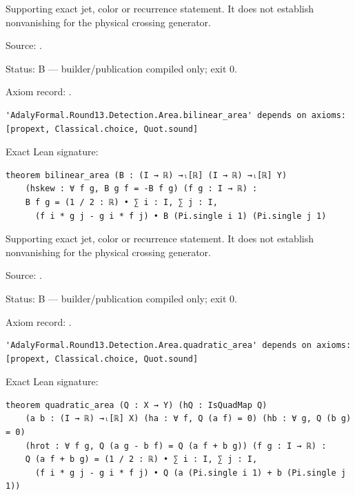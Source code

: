 \begin{theorem}[bp-516]
\label{bp-516}
\leanok
Supporting exact jet, color or recurrence statement. It does not establish nonvanishing for the physical crossing generator.

\par Source: \texttt{}.
\par Status: B — builder/publication compiled only; exit 0.
\par Axiom record: \texttt{}.
\begin{verbatim}
'AdalyFormal.Round13.Detection.Area.bilinear_area' depends on axioms: [propext, Classical.choice, Quot.sound]
\end{verbatim}
\par Exact Lean signature:
\begin{verbatim}
theorem bilinear_area (B : (I → ℝ) →ₗ[ℝ] (I → ℝ) →ₗ[ℝ] Y)
    (hskew : ∀ f g, B g f = -B f g) (f g : I → ℝ) :
    B f g = (1 / 2 : ℝ) • ∑ i : I, ∑ j : I,
      (f i * g j - g i * f j) • B (Pi.single i 1) (Pi.single j 1)
\end{verbatim}
\end{theorem}

\begin{theorem}[bp-517]
\label{bp-517}
\leanok
Supporting exact jet, color or recurrence statement. It does not establish nonvanishing for the physical crossing generator.

\par Source: \texttt{}.
\par Status: B — builder/publication compiled only; exit 0.
\par Axiom record: \texttt{}.
\begin{verbatim}
'AdalyFormal.Round13.Detection.Area.quadratic_area' depends on axioms: [propext, Classical.choice, Quot.sound]
\end{verbatim}
\par Exact Lean signature:
\begin{verbatim}
theorem quadratic_area (Q : X → Y) (hQ : IsQuadMap Q)
    (a b : (I → ℝ) →ₗ[ℝ] X) (ha : ∀ f, Q (a f) = 0) (hb : ∀ g, Q (b g) = 0)
    (hrot : ∀ f g, Q (a g - b f) = Q (a f + b g)) (f g : I → ℝ) :
    Q (a f + b g) = (1 / 2 : ℝ) • ∑ i : I, ∑ j : I,
      (f i * g j - g i * f j) • Q (a (Pi.single i 1) + b (Pi.single j 1))
\end{verbatim}
\end{theorem}

